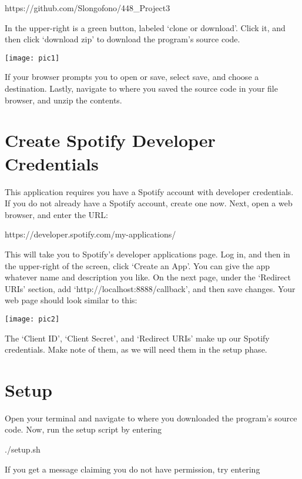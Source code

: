 \documentclass{roffin}
\begin{document}
\hspace{1cm} https://github.com/Slongofono/448\_Project3

\hfill
\newline
In the upper-right is a green button, labeled `clone or download'. Click it, and then click `download zip' to download the program’s source code.

\texttt{[image: pic1]}

If your browser prompts you to open or save, select save, and choose a destination. Lastly, navigate to where you saved the source code in your file browser, and unzip the contents.

\section{Create Spotify Developer Credentials}

This application requires you have a Spotify account with developer credentials. If you do not already have a Spotify account, create one now. Next, open a web browser, and enter the URL:  
\newline

\hspace{1cm} https://developer.spotify.com/my-applications/

\hfill
\newline
This will take you to Spotify's developer applications page. Log in, and then in the upper-right of the screen, click `Create an App'. You can give the app whatever name and description you like. On the next page, under the `Redirect URIs' section, add `http://localhost:8888/callback', and then save changes. Your web page should look similar to this: 

\texttt{[image: pic2]}

The `Client ID', `Client Secret', and `Redirect URIs' make up our Spotify credentials. Make note of them, as we will need them in the setup phase.


\section{Setup} 

Open your terminal and navigate to where you downloaded the program's source code. Now, run the setup script by entering
\newline

\hspace{1cm} ./setup.sh

\hfill
\newline
If you get a message claiming you do not have permission, try entering
\newline
\end{document}

